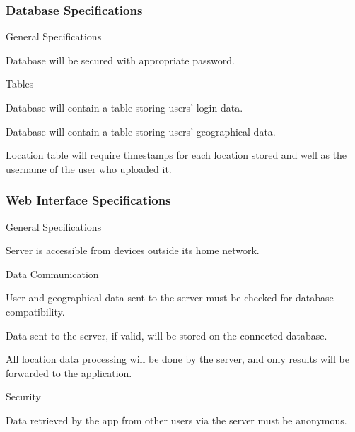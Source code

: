 \subsubsection{Database Specifications}

\begin{SA}
    \item General Specifications
    \begin{SA}
        \item Database will be secured with appropriate password.
    \end{SA}
    \item Tables
    \begin{SA}
        \item Database will contain a table storing users’ login data.
        \item Database will contain a table storing users’ geographical data.
        \item Location table will require timestamps for each location stored and well as the username of the user who uploaded it.
    \end{SA}
\end{SA}

\subsubsection{Web Interface Specifications}

\begin{SA}
    \item General Specifications
    \begin{SA}
        \item Server is accessible from devices outside its home network.
    \end{SA}
    \item Data Communication
    \begin{SA}
        \item User and geographical data sent to the server must be checked for database compatibility.
        \item Data sent to the server, if valid, will be stored on the connected database.
        \item All location data processing will be done by the server, and only results will be forwarded to the application.
    \end{SA}
    \item Security
    \begin{SA}
        \item Data retrieved by the app from other users via the server must be anonymous.
    \end{SA}
\end{SA}